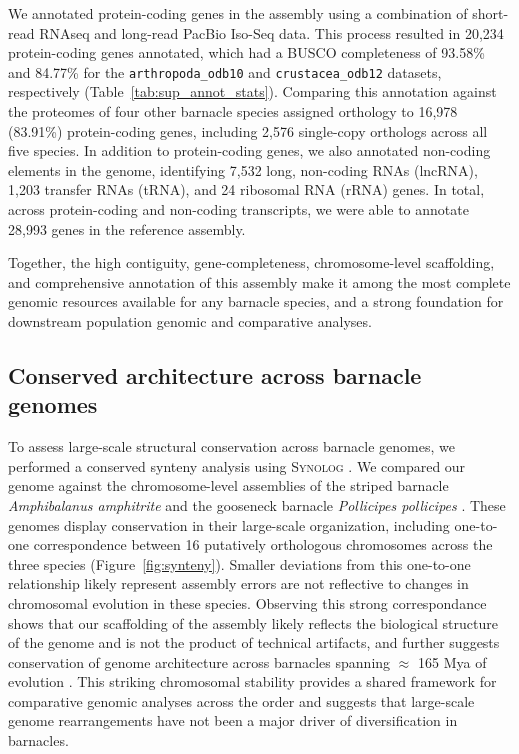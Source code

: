 We annotated protein-coding genes in the \bgla{} assembly using a combination of
short-read RNAseq and long-read PacBio Iso-Seq data.
This process resulted in 20{,}234 protein-coding genes annotated, which had a
\textsc{BUSCO} completeness of 93.58\% and 84.77\% for the \texttt{arthropoda\_odb10}
and \texttt{crustacea\_odb12} datasets, respectively (Table~\ref{tab:sup_annot_stats}).
Comparing this annotation against the proteomes of four other barnacle species assigned
orthology to 16{,}978 (83.91\%) \bgla{} protein-coding genes, including 2{,}576
single-copy orthologs across all five species.
In addition to protein-coding genes, we also annotated non-coding elements in the
genome, identifying 7{,}532 long, non-coding RNAs (lncRNA), 1{,}203 transfer RNAs (tRNA),
and 24 ribosomal RNA (rRNA) genes.
In total, across protein-coding and non-coding transcripts, we were able to annotate
28{,}993 genes in the \bgla{} reference assembly.
\vspace{0.1cm}

Together, the high contiguity, gene-completeness, chromosome-level scaffolding,
and comprehensive annotation of this assembly make it among the most complete genomic
resources available for any barnacle species, and a strong foundation for downstream
population genomic and comparative analyses.

\subsection*{Conserved architecture across barnacle genomes}

To assess large-scale structural conservation across barnacle genomes, we performed
a conserved synteny analysis using \textsc{Synolog} \citep{madrigal_synolog_2026}.
We compared our \bgla{} genome against the chromosome-level assemblies of the
striped barnacle \textit{Amphibalanus amphitrite} \citep[Balanidae;][]{han_new_2024}
and the gooseneck barnacle \textit{Pollicipes pollicipes}
\citep[Pollicipedidae;][]{bernot_chromosome-level_2022}.
These genomes display conservation in their large-scale organization, including
one-to-one correspondence between 16 putatively orthologous chromosomes across the
three species (Figure~\ref{fig:synteny}).
Smaller deviations from this one-to-one relationship likely represent assembly errors
are not reflective to changes in chromosomal evolution in these species.
Observing this strong correspondance shows that our scaffolding
of the \bgla{} assembly likely reflects the biological structure of
the genome and is not the product of technical artifacts, and further suggests
conservation of genome architecture across barnacles spanning $\approx$ 165 Mya
of evolution \citep{han_new_2024,bernot_chromosome-level_2022}.
This striking chromosomal stability provides a shared framework for comparative
genomic analyses across the order and suggests that large-scale genome
rearrangements have not been a major driver of diversification in barnacles.

